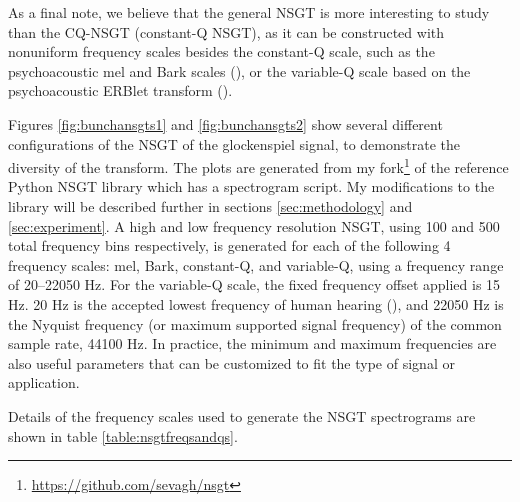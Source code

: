 \documentclass[report.tex]{subfiles}
\begin{document}
As a final note, we believe that the general NSGT is more interesting to study than the CQ-NSGT (constant-Q NSGT), as it can be constructed with nonuniform frequency scales besides the constant-Q scale, such as the psychoacoustic mel and Bark scales (\cite[Chapter~4]{melbook}), or the variable-Q scale based on the psychoacoustic ERBlet transform (\cite{variableq1, variableq2}).

Figures \ref{fig:bunchansgts1} and \ref{fig:bunchansgts2} show several different configurations of the NSGT of the glockenspiel signal, to demonstrate the diversity of the transform. The plots are generated from my fork\footnote{\url{https://github.com/sevagh/nsgt}} of the reference Python NSGT library which has a spectrogram script. My modifications to the library will be described further in sections \ref{sec:methodology} and \ref{sec:experiment}. A high and low frequency resolution NSGT, using 100 and 500 total frequency bins respectively, is generated for each of the following 4 frequency scales: mel, Bark, constant-Q, and variable-Q, using a frequency range of 20--22050 Hz. For the variable-Q scale, the fixed frequency offset applied is 15 Hz. 20 Hz is the accepted lowest frequency of human hearing (\cite{moore}), and 22050 Hz is the Nyquist frequency (or maximum supported signal frequency) of the common sample rate, 44100 Hz. In practice, the minimum and maximum frequencies are also useful parameters that can be customized to fit the type of signal or application.

Details of the frequency scales used to generate the NSGT spectrograms are shown in table \ref{table:nsgtfreqsandqs}.
\end{document}
